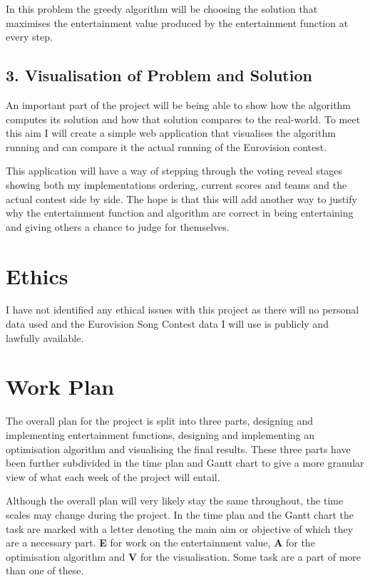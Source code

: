 \documentclass[12pt]{report}
\begin{document}
In this problem the greedy algorithm will be choosing the solution that maximises the entertainment value produced by the entertainment function at every step.

\subsection*{3. Visualisation of Problem and Solution}
An important part of the project will be being able to show how the algorithm computes its solution and how that solution compares to the real-world. To meet this aim I will create a simple web application that visualises the algorithm running and can compare it the actual running of the Eurovision contest.

This application will have a way of stepping through the voting reveal stages showing both my implementations ordering, current scores and teams and the actual contest side by side. The hope is that this will add another way to justify why the entertainment function and algorithm are correct in being entertaining and giving others a chance to judge for themselves.

\section*{Ethics}
I have not identified any ethical issues\cite{ref:Ethics} with this project as there will no personal data used and the Eurovision Song Contest data I will use is publicly and lawfully available.

\section*{Work Plan}
The overall plan for the project is split into three parts, designing and implementing entertainment functions, designing and implementing an optimisation algorithm and visualising the final results. These three parts have been further subdivided in the time plan and Gantt chart to give a more granular view of what each week of the project will entail. 

Although the overall plan will very likely stay the same throughout, the time scales may change during the project. In the time plan and the Gantt chart the task are marked with a letter denoting the main aim or objective of which they are a necessary part. \textbf{E} for work on the entertainment value, \textbf{A} for the optimisation algorithm and \textbf{V} for the visualisation. Some task are a part of more than one of these.
\end{document}
